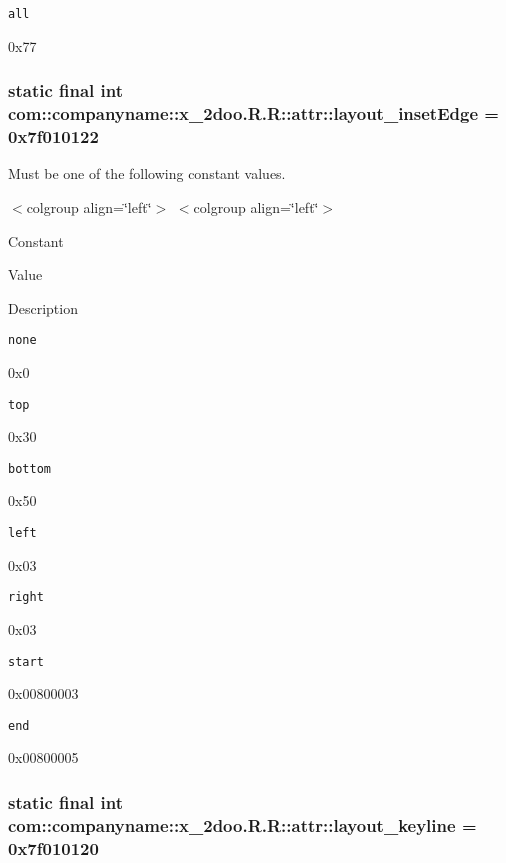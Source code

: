 {\tt all}

0x77\hypertarget{classcom_1_1companyname_1_1x__2doo_1_1_r_1_1attr_354201c6a1a7b65a5ca8ad2803cdea7f}{
\subsubsection[{layout\_\-insetEdge}]{\setlength{\rightskip}{0pt plus 5cm}static final int com::companyname::x\_\-2doo.R.R::attr::layout\_\-insetEdge = 0x7f010122}}
\label{classcom_1_1companyname_1_1x__2doo_1_1_r_1_1attr_354201c6a1a7b65a5ca8ad2803cdea7f}


Must be one of the following constant values. \begin{TabularC}{0}
\hline
\end{TabularC}
$<$colgroup align=\char`\"{}left\char`\"{}$>$ $<$colgroup align=\char`\"{}left\char`\"{}$>$ 

Constant

Value

Description 

{\tt none}

0x0

{\tt top}

0x30

{\tt bottom}

0x50

{\tt left}

0x03

{\tt right}

0x03

{\tt start}

0x00800003

{\tt end}

0x00800005\hypertarget{classcom_1_1companyname_1_1x__2doo_1_1_r_1_1attr_bf90169b6d22b8db2d59f854d9435899}{
\subsubsection[{layout\_\-keyline}]{\setlength{\rightskip}{0pt plus 5cm}static final int com::companyname::x\_\-2doo.R.R::attr::layout\_\-keyline = 0x7f010120}}
\label{classcom_1_1companyname_1_1x__2doo_1_1_r_1_1attr_bf90169b6d22b8db2d59f854d9435899}



